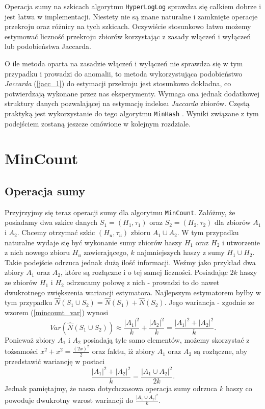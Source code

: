 Operacja sumy na szkicach algorytmu \texttt{HyperLogLog} sprawdza się całkiem dobrze i jest  łatwa w implementacji. Niestety nie są znane naturalne i zamknięte operacje przekroju oraz różnicy na tych szkicach. Oczywiście stosunkowo łatwo możemy estymować liczność przekroju zbiorów korzystając z zasady włączeń i wyłączeń lub podobieństwa Jaccarda.

O ile metoda oparta na zasadzie włączeń i wyłączeń nie sprawdza się w tym przypadku i prowadzi do anomalii, to metoda wykorzystująca podobieństwo \textit{Jaccarda} (\ref{jacc_1}) do estymacji przekroju jest stosunkowo dokładna, co potwierdzają wykonane przez nas eksperymenty. Wymaga ona jednak dodatkowej struktury danych pozwalającej na estymację indeksu \textit{Jaccarda} zbiorów. Częstą praktyką jest wykorzystanie do tego algorytmu \texttt{MinHash} \cite{adroll}. Wyniki związane z tym podejściem zostaną jeszcze omówione w kolejnym rozdziale.

\newpage 
\section{MinCount}
\label{impr_mincount}

\subsection{Operacja sumy}
\label{impr_sum}

Przyjrzyjmy się teraz operacji sumy dla algorytmu \texttt{MinCount}. Załóżmy, że posiadamy dwa szkice danych $S_1 = (H_1, {\tau}_1)$ oraz $S_2 = (H_2, {\tau}_2)$ dla zbiorów $A_1$ i $A_2$. Chcemy otrzymać szkic $(H_u, {\tau}_u)$ zbioru $A_1 \cup A_2$. W tym przypadku naturalne wydaje się być wykonanie sumy zbiorów haszy $H_1$ oraz $H_2$ i utworzenie z nich nowego zbioru $H_u$ zawierającego, $k$ najmniejszych haszy z sumy $H_1 \cup H_2$. Takie podejście  odrzuca jednak dużą ilość informacji. Weźmy jako przykład dwa zbiory $A_1$ oraz $A_2$, które są rozłączne i o tej samej liczności.
Posiadając $2k$ haszy ze zbiorów $H_1$ i $H_2$ odrzucamy połowę z nich - prowadzi to do nawet dwukrotnego zwiększenia wariancji estymatora. 
 Najlepszym estymatorem byłby w tym przypadku $\hat{N}(S_1 \cup S_2) = \hat{N}(S_1) + \hat{N}(S_2)$. Jego wariancja - zgodnie ze wzorem (\ref{mincount_var}) wynosi $$Var(\hat{N}(S_1 \cup S_2)) \approx \frac{|A_1|^2}{k} + \frac{|A_2|^2}{k} = \frac{|A_1|^2 + |A_2|^2}{k}.$$ Ponieważ zbiory $A_1$ i $A_2$ posiadają tyle samo elementów, możemy skorzystać z tożsamości $x^2 + x^2  = \frac{(2x)^2}{2}$ oraz faktu, iż zbiory $A_1$ oraz $A_2$ są rozłączne, aby przedstawić wariancję w postaci $$\frac{|A_1|^2 + |A_2|^2}{k} = \frac{|A_1 \cup A_2|^2}{2k}.$$ Jednak pamiętajmy, że nasza dotychczasowa operacja sumy odrzuca $k$ haszy co powoduje dwukrotny wzrost wariancji do $\frac{|A_1 \cup A_2|^2}{k}$.

